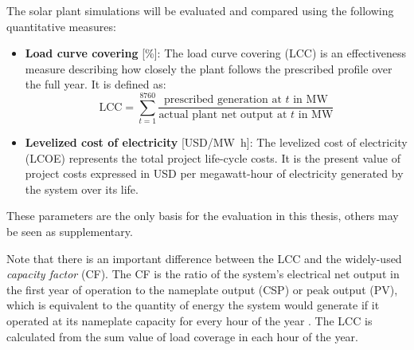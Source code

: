 
The solar plant simulations will be evaluated and compared using the following quantitative measures:
\begin{itemize}
\item \textbf{Load curve covering} [\si{\percent}]: The load curve covering (LCC) is an effectiveness measure describing how closely the plant follows the prescribed profile over the full year. It is defined as:
\begin{equation}
\mbox{LCC} = \sum\limits_{t=1}^{8760} \frac{\mbox{prescribed generation at }t\mbox{ in MW}}{\mbox{actual plant net output at }t\mbox{ in MW}} \label{GL_GCC}
\end{equation} 
\item \textbf{Levelized cost of electricity} [USD/\si{\mega\watt\hour}]: The levelized cost of electricity (LCOE) represents the total project life-cycle costs. It is the present value of project costs expressed in USD per megawatt-hour of electricity generated by the system over its life.
\end{itemize}

These parameters are the only basis for the evaluation in this thesis, others may be seen as supplementary. 


Note that there is an important difference between the LCC and the widely-used \emph{capacity factor} (CF). The CF is the ratio of the system's electrical net output in the first year of operation to the nameplate output (CSP) or peak output (PV), which is equivalent to the quantity of energy the system would generate if it operated at its nameplate capacity for every hour of the year \cite{NREL2015a}. The LCC is calculated from the sum value of load coverage in each hour of the year. 


\pagebreak 